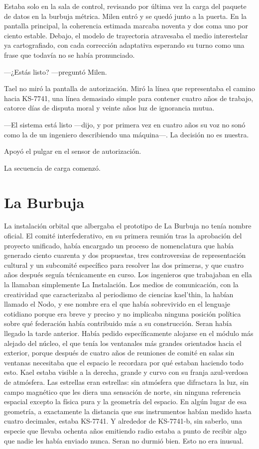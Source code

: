 \documentclass[11pt,a5paper,twoside]{book}
\begin{document}
Estaba solo en la sala de control, revisando por última vez la carga del paquete de datos en la burbuja métrica. Milen entró y se quedó junto a la puerta. En la pantalla principal, la coherencia estimada marcaba noventa y dos coma uno por ciento estable. Debajo, el modelo de trayectoria atravesaba el medio interestelar ya cartografiado, con cada corrección adaptativa esperando su turno como una frase que todavía no se había pronunciado.

—¿Estás listo? —preguntó Milen.

Tael no miró la pantalla de autorización. Miró la línea que representaba el camino hacia KS-7741, una línea demasiado simple para contener cuatro años de trabajo, catorce días de disputa moral y veinte años luz de ignorancia mutua.

—El sistema está listo —dijo, y por primera vez en cuatro años su voz no sonó como la de un ingeniero describiendo una máquina—. La decisión no es nuestra.

Apoyó el pulgar en el sensor de autorización.

La secuencia de carga comenzó.

\chapter{La Burbuja}

La instalación orbital que albergaba el prototipo de La Burbuja no tenía nombre oficial.
El comité interfederativo, en su primera reunión tras la aprobación del proyecto unificado, había encargado un proceso de nomenclatura que había generado ciento cuarenta y dos propuestas, tres controversias de representación cultural y un subcomité específico para resolver las dos primeras, y que cuatro años después seguía técnicamente en curso. Los ingenieros que trabajaban en ella la llamaban simplemente La Instalación. Los medios de comunicación, con la creatividad que caracterizaba al periodismo de ciencias kael'thin, la habían llamado el Nodo, y ese nombre era el que había sobrevivido en el lenguaje cotidiano porque era breve y preciso y no implicaba ninguna posición política sobre qué federación había contribuido más a su construcción.
Seran había llegado la tarde anterior. Había pedido específicamente alojarse en el módulo más alejado del núcleo, el que tenía los ventanales más grandes orientados hacia el exterior, porque después de cuatro años de reuniones de comité en salas sin ventanas necesitaba que el espacio le recordara por qué estaban haciendo todo esto.
Kael estaba visible a la derecha, grande y curvo con su franja azul-verdosa de atmósfera. Las estrellas eran estrellas: sin atmósfera que difractara la luz, sin campo magnético que les diera una sensación de norte, sin ninguna referencia espacial excepto la física pura y la geometría del espacio. En algún lugar de esa geometría, a exactamente la distancia que sus instrumentos habían medido hasta cuatro decimales, estaba KS-7741.
Y alrededor de KS-7741-b, sin saberlo, una especie que llevaba ochenta años emitiendo radio estaba a punto de recibir algo que nadie les había enviado nunca.
Seran no durmió bien. Esto no era inusual.
\end{document}
